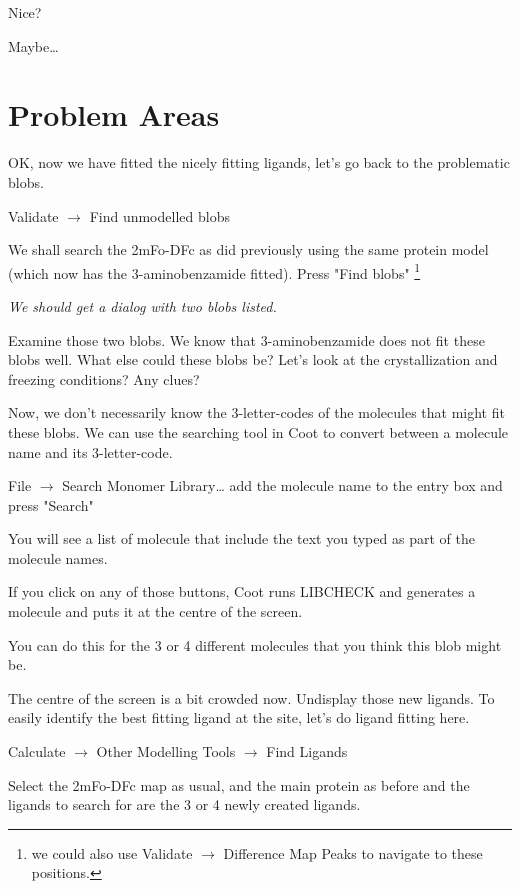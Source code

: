 \documentclass{article}
\begin{document}
 \begin{trivlist}
 \item Nice?

 \textsf{Maybe\ldots}
 \end{trivlist}

\section{Problem Areas}

OK, now we have fitted the nicely fitting ligands, let's go back to
the problematic blobs.

 \textsf{Validate $\rightarrow$ Find unmodelled blobs}

 We shall search the 2mFo-DFc as did previously using the same protein
 model (which now has the 3-aminobenzamide fitted).  Press "Find
 blobs" \footnote{we could also use \textsf{Validate $\rightarrow$
     Difference Map Peaks} to navigate to these positions.}

\textsl{ We should get a dialog with two blobs listed.}
 
Examine those two blobs.  We know that 3-aminobenzamide does not fit
these blobs well.  What else could these blobs be?  Let's look at the
crystallization and freezing conditions?  Any clues?

 Now, we don't necessarily know the 3-letter-codes of the molecules
 that might fit these blobs. We can use the searching tool in Coot to
 convert between a molecule name and its 3-letter-code.  

 \textsf{File $\rightarrow$ Search Monomer Library\ldots}
 add the molecule name to the entry box and press "Search"

 You will see a list of molecule that include the text you typed as
 part of the molecule names.

 If you click on any of those buttons, Coot runs LIBCHECK and
 generates a molecule and puts it at the centre of the screen.

 You can do this for the 3 or 4 different molecules that you think
 this blob might be.

 The centre of the screen is a bit crowded now.  Undisplay those new
 ligands.  To easily identify the best fitting ligand at the site,
 let's do ligand fitting here.

 \textsf{Calculate $\rightarrow$ Other Modelling Tools $\rightarrow$
   Find Ligands }

 Select the 2mFo-DFc map as usual, and the main protein as before and
 the ligands to search for are the 3 or 4 newly created ligands.
\end{document}
